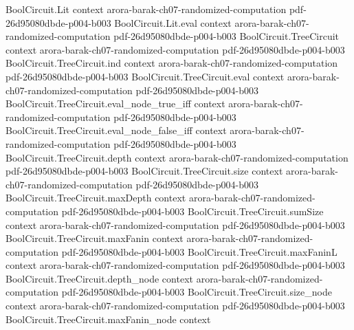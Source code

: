 \begin{theorem}
\label{Randomized.inBPP_PITLang}
\leanok
{}
\proofstep
  {BoolCircuit.Lit}
  {context}
  {arora-barak-ch07-randomized-computation}
  {pdf-26d95080dbde-p004-b003}
\proofstep
  {BoolCircuit.Lit.eval}
  {context}
  {arora-barak-ch07-randomized-computation}
  {pdf-26d95080dbde-p004-b003}
\proofstep
  {BoolCircuit.TreeCircuit}
  {context}
  {arora-barak-ch07-randomized-computation}
  {pdf-26d95080dbde-p004-b003}
\proofstep
  {BoolCircuit.TreeCircuit.ind}
  {context}
  {arora-barak-ch07-randomized-computation}
  {pdf-26d95080dbde-p004-b003}
\proofstep
  {BoolCircuit.TreeCircuit.eval}
  {context}
  {arora-barak-ch07-randomized-computation}
  {pdf-26d95080dbde-p004-b003}
\proofstep
  {BoolCircuit.TreeCircuit.eval_node_true_iff}
  {context}
  {arora-barak-ch07-randomized-computation}
  {pdf-26d95080dbde-p004-b003}
\proofstep
  {BoolCircuit.TreeCircuit.eval_node_false_iff}
  {context}
  {arora-barak-ch07-randomized-computation}
  {pdf-26d95080dbde-p004-b003}
\proofstep
  {BoolCircuit.TreeCircuit.depth}
  {context}
  {arora-barak-ch07-randomized-computation}
  {pdf-26d95080dbde-p004-b003}
\proofstep
  {BoolCircuit.TreeCircuit.size}
  {context}
  {arora-barak-ch07-randomized-computation}
  {pdf-26d95080dbde-p004-b003}
\proofstep
  {BoolCircuit.TreeCircuit.maxDepth}
  {context}
  {arora-barak-ch07-randomized-computation}
  {pdf-26d95080dbde-p004-b003}
\proofstep
  {BoolCircuit.TreeCircuit.sumSize}
  {context}
  {arora-barak-ch07-randomized-computation}
  {pdf-26d95080dbde-p004-b003}
\proofstep
  {BoolCircuit.TreeCircuit.maxFanin}
  {context}
  {arora-barak-ch07-randomized-computation}
  {pdf-26d95080dbde-p004-b003}
\proofstep
  {BoolCircuit.TreeCircuit.maxFaninL}
  {context}
  {arora-barak-ch07-randomized-computation}
  {pdf-26d95080dbde-p004-b003}
\proofstep
  {BoolCircuit.TreeCircuit.depth_node}
  {context}
  {arora-barak-ch07-randomized-computation}
  {pdf-26d95080dbde-p004-b003}
\proofstep
  {BoolCircuit.TreeCircuit.size_node}
  {context}
  {arora-barak-ch07-randomized-computation}
  {pdf-26d95080dbde-p004-b003}
\proofstep
  {BoolCircuit.TreeCircuit.maxFanin_node}
  {context}

\end{theorem}
